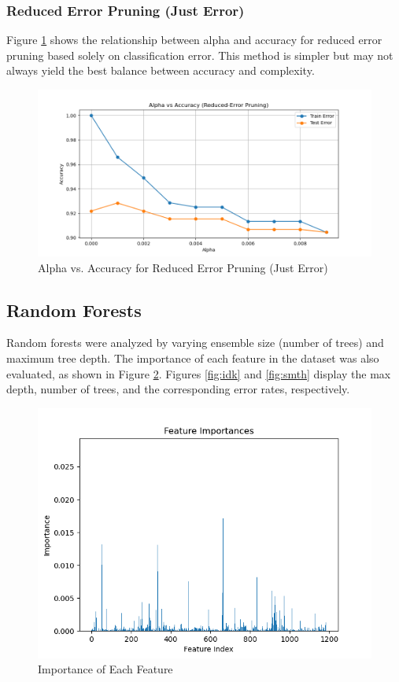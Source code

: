 \documentclass[12pt]{article}
\begin{document}
\subsubsection{Reduced Error Pruning (Just Error)}
Figure \ref{fig:error} shows the relationship between alpha and accuracy for reduced error pruning based solely on classification error. This method is simpler but may not always yield the best balance between accuracy and complexity.

\begin{figure}[h!]
    \centering
    \includegraphics[width=0.8\linewidth]{figures/Reduced Error Pruning/alpha vs accuracy.png}
    \caption{Alpha vs. Accuracy for Reduced Error Pruning (Just Error)}
    \label{fig:error}
\end{figure}

\subsection{Random Forests}
Random forests were analyzed by varying ensemble size (number of trees) and maximum tree depth. The importance of each feature in the dataset was also evaluated, as shown in Figure \ref{fig:uh}. Figures \ref{fig:idk} and \ref{fig:smth} display the max depth, number of trees, and the corresponding error rates, respectively.

\begin{figure}[h!]
    \centering
    \includegraphics[width=0.8\linewidth]{figures/Random Forests/Feature Importance.png}
    \caption{Importance of Each Feature}
    \label{fig:uh}
\end{figure}
\end{document}
